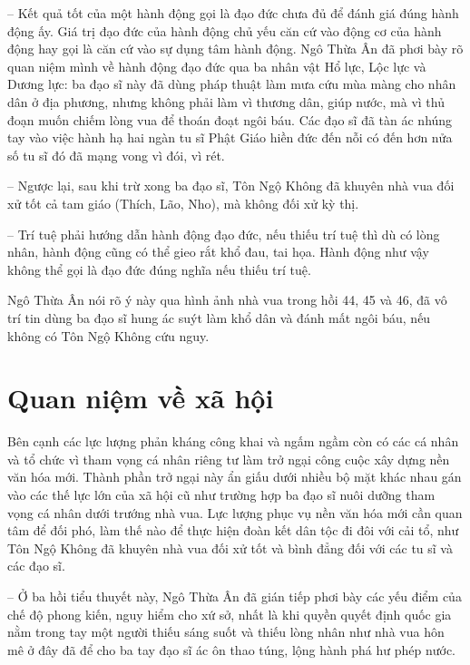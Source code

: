 -- Kết quả tốt của một hành động gọi là đạo đức chưa đủ để đánh giá đúng hành động ấy. Giá trị đạo đức của hành động chủ yếu căn cứ vào động cơ của hành động hay gọi là căn cứ vào sự dụng tâm hành động. Ngô Thừa Ân đã phơi bày rõ quan niệm mình về hành động đạo đức qua ba nhân vật Hổ lực, Lộc lực và Dương lực: ba đạo sĩ này đã dùng pháp thuật làm mưa cứu mùa màng cho nhân dân ở địa phương, nhưng không phải làm vì thương dân, giúp nước, mà vì thủ đoạn muốn chiếm lòng vua để thoán đoạt ngôi báu. Các đạo sĩ đã tàn ác nhúng tay vào việc hành hạ hai ngàn tu sĩ Phật Giáo hiền đức đến nỗi có đến hơn nửa số tu sĩ đó đã mạng vong vì đói, vì rét.

-- Ngược lại, sau khi trừ xong ba đạo sĩ, Tôn Ngộ Không đã khuyên nhà vua đối xử tốt cả tam giáo (Thích, Lão, Nho), mà không đối xử kỳ thị.

-- Trí tuệ phải hướng dẫn hành động đạo đức, nếu thiếu trí tuệ thì dù có lòng nhân, hành động cũng có thể gieo rắt khổ đau, tai họa. Hành động như vậy không thể gọi là đạo đức đúng nghĩa nếu thiếu trí tuệ.

Ngô Thừa Ân nói rõ ý này qua hình ảnh nhà vua trong hồi 44, 45 và 46, đã vô trí tin dùng ba đạo sĩ hung ác suýt làm khổ dân và đánh mất ngôi báu, nếu không có Tôn Ngộ Không cứu nguy.


\section{Quan niệm về xã hội} %
\label{sec:44_45_xa_hoi}

Bên cạnh các lực lượng phản kháng công khai và ngấm ngầm còn có các cá nhân và tổ chức vì tham vọng cá nhân riêng tư làm trở ngại công cuộc xây dựng nền văn hóa mới. Thành phần trở ngại này ẩn giấu dưới nhiều bộ mặt khác nhau gán vào các thế lực lớn của xã hội cũ như trường hợp ba đạo sĩ nuôi dưỡng tham vọng cá nhân dưới trướng nhà vua. Lực lượng phục vụ nền văn hóa mới cần quan tâm để đối phó, làm thế nào để thực hiện đoàn kết dân tộc đi đôi với cải tổ, như Tôn Ngộ Không đã khuyên nhà vua đối xử tốt và bình đẳng đối với các tu sĩ và các đạo sĩ.

-- Ở ba hồi tiểu thuyết này, Ngô Thừa Ân đã gián tiếp phơi bày các yếu điểm của chế độ phong kiến, nguy hiểm cho xứ sở, nhất là khi quyền quyết định quốc gia nằm trong tay một người thiếu sáng suốt và thiếu lòng nhân như nhà vua hôn mê ở đây đã để cho ba tay đạo sĩ ác ôn thao túng, lộng hành phá hư phép nước.

